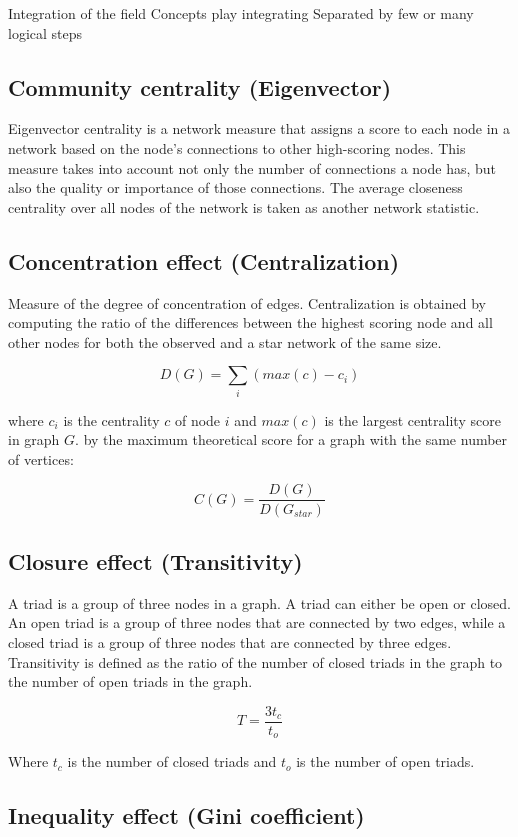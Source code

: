 Integration of the field
Concepts play integrating
Separated by few or many logical steps

\subsection{Community centrality (Eigenvector)}

Eigenvector centrality is a network measure that assigns a score to each node in a network based on the node's connections to other high-scoring nodes. This measure takes into account not only the number of connections a node has, but also the quality or importance of those connections. The average closeness centrality over all nodes of the network is taken as another network statistic.


\subsection{Concentration effect (Centralization)}

Measure of the degree of concentration of edges. Centralization is obtained by computing the ratio of the differences between the highest scoring node and all other nodes for both the observed and a star network of the same size.

$$
D(G) = \sum_i (max(c) - c_i)
$$

where $c_i$ is the centrality $c$ of node $i$ and $max(c)$ is the largest centrality score in graph $G$.  by the maximum theoretical score for a graph with the same number of vertices:

$$
C(G) = \frac{D(G)}{D(G_{star})}
$$

\subsection{Closure effect (Transitivity)}

A triad is a group of three nodes in a graph. A triad can either be open or closed. An open triad is a group of three nodes that are connected by two edges, while a closed triad is a group of three nodes that are connected by three edges. Transitivity is defined as the ratio of the number of closed triads in the graph to the number of open triads in the graph.

$$
T = \frac{3t_c}{t_o}
$$

Where $t_c$ is the number of closed triads and $t_o$ is the number of open triads.

\subsection{Inequality effect (Gini coefficient)}


